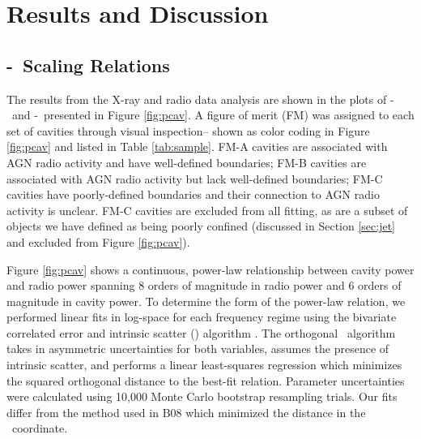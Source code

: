 \documentclass{emulateapj}
\begin{document}
\section{Results and Discussion}
\label{sec:r&d}

\subsection{\pjet-\prad\ Scaling Relations}
\label{sec:relation}

The results from the X-ray and radio data analysis are shown in the
plots of \pcav-\phigh\ and \pcav-\plow\ presented in Figure
\ref{fig:pcav}. A figure of merit (FM) was assigned to each set of
cavities through visual inspection-- shown as color coding in Figure
\ref{fig:pcav} and listed in Table \ref{tab:sample}. FM-A cavities are
associated with AGN radio activity and have well-defined boundaries;
FM-B cavities are associated with AGN radio activity but lack
well-defined boundaries; FM-C cavities have poorly-defined boundaries
and their connection to AGN radio activity is unclear. FM-C cavities
are excluded from all fitting, as are a subset of objects we have
defined as being poorly confined (discussed in Section \ref{sec:jet}
and excluded from Figure \ref{fig:pcav}).

Figure \ref{fig:pcav} shows a continuous, power-law relationship
between cavity power and radio power spanning 8 orders of magnitude in
radio power and 6 orders of magnitude in cavity power. To determine
the form of the power-law relation, we performed linear fits in
log-space for each frequency regime using the bivariate correlated
error and intrinsic scatter (\bces) algorithm \citep{bces}. The
orthogonal \bces\ algorithm takes in asymmetric uncertainties for both
variables, assumes the presence of intrinsic scatter, and performs a
linear least-squares regression which minimizes the squared orthogonal
distance to the best-fit relation. Parameter uncertainties were
calculated using 10,000 Monte Carlo bootstrap resampling trials. Our
fits differ from the method used in B08 which minimized the distance
in the \pcav\ coordinate.
\end{document}
